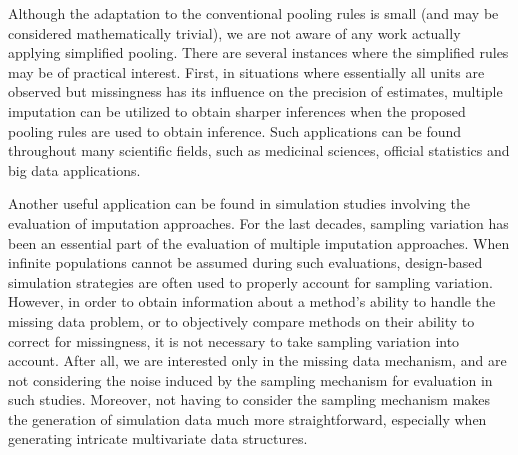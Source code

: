 \documentclass[12pt, a4paper]{article}
\begin{document}
\citet{peeters2015} Although the adaptation to the conventional pooling rules is small (and may be considered mathematically trivial), we are not aware of any work actually applying simplified pooling. There are several instances where the simplified rules may be of practical interest. First, in situations where essentially all units are observed but missingness has its influence on the precision of estimates, multiple imputation can be utilized to obtain sharper inferences when the proposed pooling rules are used to obtain inference. Such applications can be found throughout many scientific fields, such as medicinal sciences, official statistics and big data applications. 

Another useful application can be found in simulation studies involving the evaluation of imputation approaches. For the last decades, sampling variation has been an essential part of the evaluation of multiple imputation approaches. When infinite populations cannot be assumed during such evaluations, design-based simulation strategies are often used to properly account for sampling variation. However, in order to obtain information about a method's ability to handle the missing data problem, or to objectively compare methods on their ability to correct for missingness, it is not necessary to take sampling variation into account. After all, we are interested only in the missing data mechanism, and are not considering the noise induced by the sampling mechanism for evaluation in such studies. Moreover, not having to consider the sampling mechanism makes the generation of simulation data much more straightforward, especially when generating intricate multivariate data structures.

\end{document}
